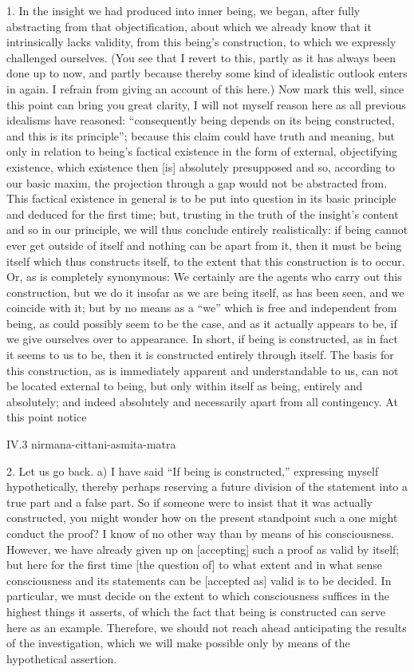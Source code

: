 1. In the insight we had produced into inner being,
we began, after fully abstracting from that objectification,
about which we already know that it intrinsically lacks validity,
from this being's construction,
to which we expressly challenged ourselves.
(You see that I revert to this,
partly as it has always been done up to now,
and partly because thereby some kind of
idealistic outlook enters in again.
I refrain from giving an account of this here.)
Now mark this well, since this point can bring you great clarity,
I will not myself reason here as all previous idealisms have reasoned:
“consequently being depends on its being constructed,
and this is its principle”;
because this claim could have truth and meaning,
but only in relation to being's factical existence
in the form of external, objectifying existence,
which existence then [is] absolutely presupposed
and so, according to our basic maxim,
the projection through a gap would not be abstracted from.
This factical existence in general is to be put into question
in its basic principle and deduced for the first time;
but, trusting in the truth of the insight's content
and so in our principle,
we will thus conclude entirely realistically:
if being cannot ever get outside of itself
and nothing can be apart from it,
then it must be being itself
which thus constructs itself,
to the extent that this construction is to occur.
Or, as is completely synonymous:
We certainly are the agents who carry out this construction,
but we do it insofar as we are being itself,
as has been seen, and we coincide with it;
but by no means as a “we” which
is free and independent from being,
as could possibly seem to be the case,
and as it actually appears to be,
if we give ourselves over to appearance.
In short, if being is constructed,
as in fact it seems to us to be,
then it is constructed entirely through itself.
The basis for this construction,
as is immediately apparent and understandable to us,
can not be located external to being,
but only within itself as being, entirely and absolutely;
and indeed absolutely and necessarily
apart from all contingency.
At this point notice

IV.3
nirmana-cittani-asmita-matra

2. Let us go back.
a) I have said “If being is constructed,”
expressing myself hypothetically,
thereby perhaps reserving a future division
of the statement into a true part and a false part.
So if someone were to insist that it was actually constructed,
you might wonder how on the present standpoint
such a one might conduct the proof?
I know of no other way than by means of his consciousness.
However, we have already given up on [accepting]
such a proof as valid by itself;
but here for the first time [the question of]
to what extent and in what sense
consciousness and its statements
can be [accepted as] valid is to be decided.
In particular, we must decide on the extent
to which consciousness suffices
in the highest things it asserts,
of which the fact that being is constructed
can serve here as an example.
Therefore, we should not reach ahead
anticipating the results of the investigation,
which we will make possible only by means of
the hypothetical assertion.

